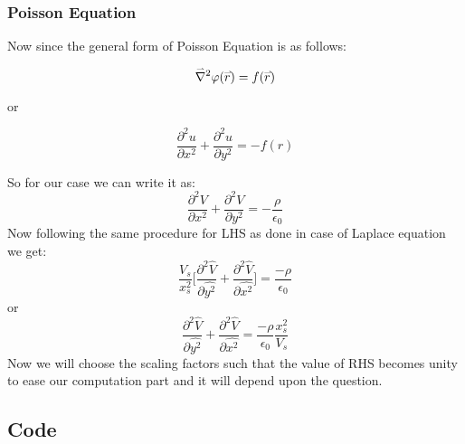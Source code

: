 	\subsubsection{Poisson Equation}
	\noindent
	Now since the general form of Poisson Equation is as follows:
	\begin{center}
		$$\accentset{\rightharpoonup}{\nabla}^2 \varphi(\accentset{\rightharpoonup}{r}) =  f(\accentset{\rightharpoonup}{r})$$
	\end{center}
	\noindent
	or 
	\begin{center}
		\[  
		\frac{\partial^2 u}{\partial x^2} + \frac{\partial^2 u}{\partial y^2} = - f({r})
		\]
	\end{center}
	
	So for our case we can write it as:
	\[  
	\frac{\partial^2 V}{\partial x^2} + \frac{\partial^2 V}{\partial y^2} =  -\frac{\rho}{\epsilon_0}
	\]
	Now following the same procedure  for LHS as done in case of Laplace equation we get:
		\[  \frac{V_s}{x_s^2} \Big[{\frac{\partial^2 \hat{V}}{\partial \hat{y^2}}} +  {\frac{\partial^2 \hat{V}}{\partial \hat{x^2}}}\Big] =   \frac{-\rho}{\epsilon_0} \]
	or
		\[  {\frac{\partial^2 \hat{V}}{\partial \hat{y^2}}} +  {\frac{\partial^2 \hat{V}}{\partial \hat{x^2}}} =   \frac{-\rho}{\epsilon_0} \frac{x_s^2}{V_s} \]
		Now we will choose the scaling factors such that the value of RHS becomes unity to ease our computation part and it will depend upon the question.
		
\subsection{Code}
